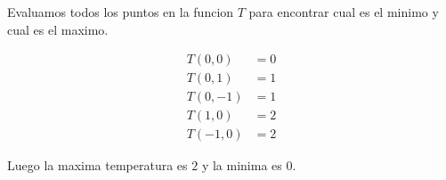 \documentclass[a4paper,oneside,10.5pt]{article}
\begin{document}
\begin{sol}
    Evaluamos todos los puntos en la funcion $T$ para encontrar cual es el minimo y cual es el maximo.

    \begin{align*}
        T(0, 0) &= 0\\
        T(0, 1) &= 1\\
        T(0, -1) &= 1\\
        T(1, 0) &= 2\\
        T(-1, 0) &= 2
    \end{align*}

    Luego la maxima temperatura es $2$ y la minima es $0$.
\end{sol}
\end{document}
